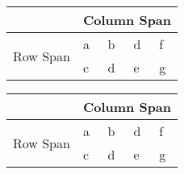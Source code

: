 \begin{table}[!htb]
    \centering
    \begin{tabular}{lllll}
        \hline
        \textbf{} & \multicolumn{4}{l}{Column Span} \\ \hline
        \multirow{2}{*}{Row Span} & a & b & d & f \\
         & c & d & e & g \\ \hline
        \end{tabular}
\end{table}


\begin{table}[!htb]
    \centering
    \begin{tabular}{lllll}
        \hline
        \textbf{} & \multicolumn{4}{l}{Column Span} \\ \hline
        \multirow{2}{*}{Row Span} & a & b & d & f \\
         & c & d & e & g \\ \hline
        \end{tabular}
\end{table}
